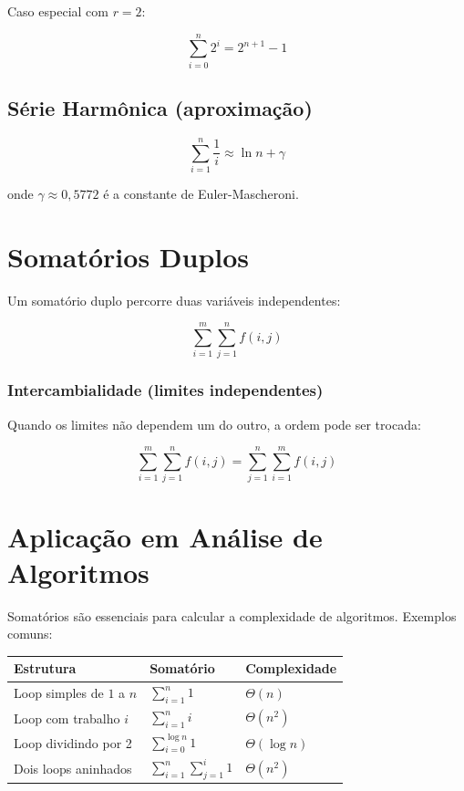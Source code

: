 \documentclass[12pt, a4paper]{article}
\begin{document}
Caso especial com $r = 2$:

\[
\sum_{i=0}^{n} 2^i = 2^{n+1} - 1
\]

\subsection{Série Harmônica (aproximação)}

\[
\sum_{i=1}^{n} \frac{1}{i} \approx \ln n + \gamma
\]

onde $\gamma \approx 0{,}5772$ é a constante de Euler-Mascheroni.

\section{Somatórios Duplos}

Um somatório duplo percorre duas variáveis independentes:

\[
\sum_{i=1}^{m} \sum_{j=1}^{n} f(i, j)
\]

\subsubsection*{Intercambialidade (limites independentes)}
Quando os limites não dependem um do outro, a ordem pode ser trocada:

\[
\sum_{i=1}^{m} \sum_{j=1}^{n} f(i, j) = \sum_{j=1}^{n} \sum_{i=1}^{m} f(i, j)
\]

\section{Aplicação em Análise de Algoritmos}

Somatórios são essenciais para calcular a complexidade de algoritmos. Exemplos comuns:

\begin{center}
\begin{tabular}{lll}
\toprule
\textbf{Estrutura} & \textbf{Somatório} & \textbf{Complexidade} \\
\midrule
Loop simples de $1$ a $n$ & $\displaystyle\sum_{i=1}^{n} 1$ & $\Theta(n)$ \\[10pt]
Loop com trabalho $i$ & $\displaystyle\sum_{i=1}^{n} i$ & $\Theta(n^2)$ \\[10pt]
Loop dividindo por 2 & $\displaystyle\sum_{i=0}^{\log n} 1$ & $\Theta(\log n)$ \\[10pt]
Dois loops aninhados & $\displaystyle\sum_{i=1}^{n}\sum_{j=1}^{i} 1$ & $\Theta(n^2)$ \\
\bottomrule
\end{tabular}
\end{center}
\end{document}
